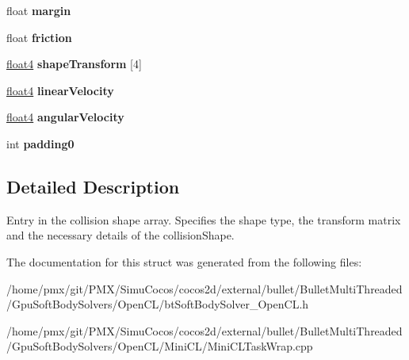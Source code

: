 \begin{DoxyCompactItemize}
float {\bfseries margin}
\item 
\mbox{\label{structCollisionShapeDescription_a63828095817a110640e6ed25a5d937f7}} 
float {\bfseries friction}
\item 
\mbox{\label{structCollisionShapeDescription_a4d60eb62c5a0b3ac26324d0f51891fb0}} 
\hyperlink{structfloat4}{float4} {\bfseries shape\+Transform} \mbox{[}4\mbox{]}
\item 
\mbox{\label{structCollisionShapeDescription_ac53b422f59e73501ce9bde7f87a96be5}} 
\hyperlink{structfloat4}{float4} {\bfseries linear\+Velocity}
\item 
\mbox{\label{structCollisionShapeDescription_af03b78a96287d84aa35699ee7314ecaf}} 
\hyperlink{structfloat4}{float4} {\bfseries angular\+Velocity}
\item 
\mbox{\label{structCollisionShapeDescription_aa83053e879feca22b1924baaaaf70621}} 
int {\bfseries padding0}
\end{DoxyCompactItemize}


\subsection{Detailed Description}
Entry in the collision shape array. Specifies the shape type, the transform matrix and the necessary details of the collision\+Shape. 

The documentation for this struct was generated from the following files\+:\begin{DoxyCompactItemize}
\item 
/home/pmx/git/\+P\+M\+X/\+Simu\+Cocos/cocos2d/external/bullet/\+Bullet\+Multi\+Threaded/\+Gpu\+Soft\+Body\+Solvers/\+Open\+C\+L/bt\+Soft\+Body\+Solver\+\_\+\+Open\+C\+L.\+h\item 
/home/pmx/git/\+P\+M\+X/\+Simu\+Cocos/cocos2d/external/bullet/\+Bullet\+Multi\+Threaded/\+Gpu\+Soft\+Body\+Solvers/\+Open\+C\+L/\+Mini\+C\+L/Mini\+C\+L\+Task\+Wrap.\+cpp\end{DoxyCompactItemize}
